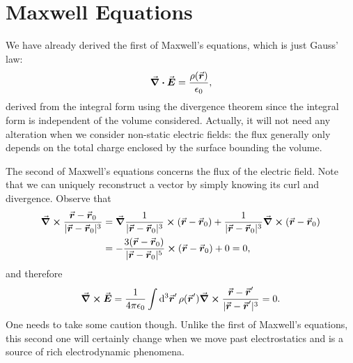 \chapter{Maxwell Equations}

We have already derived the first of Maxwell's equations, which is just Gauss' law:
\begin{eqnarray}
    \div{\va*{E}} = \frac{\rho(\va*{r})}{\epsilon_0}
,\end{eqnarray}
derived from the integral form using the divergence theorem since the integral form is independent of the volume considered.
Actually, it will not need any alteration when we consider non-static electric fields: the flux generally only depends on the total charge enclosed by the surface bounding the volume.

The second of Maxwell's equations concerns the flux of the electric field.
Note that we can uniquely reconstruct a vector by simply knowing its curl and divergence.
Observe that 
\begin{align}
    \curl{\frac{\va*{r} - \va*{r}_{0}}{|\va*{r} - \va*{r}_{0}|^3}} &=  \grad{ \frac{1}{|\va*{r} - \va*{r}_{0}|^3} } \cross (\va*{r} - \va*{r}_{0}) + \frac{1}{|\va*{r} - \va*{r}_{0}|^3} \curl{(\va*{r} - \va*{r}_{0})} \\
                                                                   &= -\frac{3(\va*{r} - \va*{r}_{0})}{|\va*{r} - \va*{r}_{0}|^{5}} \cross (\va*{r} - \va*{r}_{0}) + 0 = 0
,\end{align}
and therefore
\begin{eqnarray}
    \label{eq:curl-E}
    \curl{\va*{E}} = \frac{1}{4 \pi \epsilon_0} \int \dd[3]{\va*{r}'} \rho(\va*{r}') \curl{\frac{\va*{r} - \va*{r}'}{|\va*{r} - \va*{r}'|^3}} = 0
.\end{eqnarray}
One needs to take some caution though.
Unlike the first of Maxwell's equations, this second one will certainly change when we move past electrostatics and is a source of rich electrodynamic phenomena.






